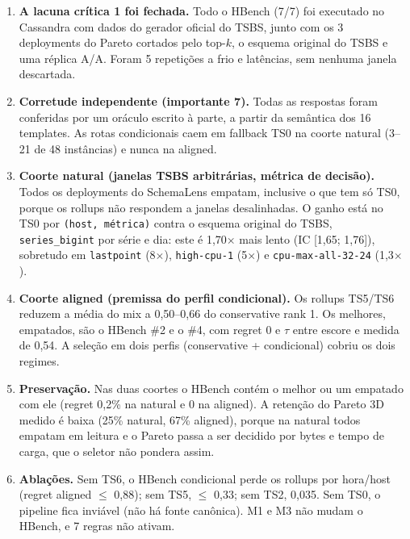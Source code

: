 \begin{enumerate}
\item \textbf{A lacuna crítica 1 foi fechada.} Todo o HBench (7/7) foi executado no Cassandra com dados do gerador oficial do TSBS, junto com os 3 deployments do Pareto cortados pelo top-$k$, o esquema original do TSBS e uma réplica A/A. Foram 5 repetições a frio e \envrawrows{} latências, sem nenhuma janela descartada.
\item \textbf{Corretude independente (importante 7).} Todas as respostas foram conferidas por um oráculo escrito à parte, a partir da semântica dos 16 templates. As rotas condicionais caem em fallback TS0 na coorte natural (3--21 de 48 instâncias) e nunca na aligned.
\item \textbf{Coorte natural (janelas TSBS arbitrárias, métrica de decisão).} Todos os deployments do SchemaLens empatam, inclusive o que tem só TS0, porque os rollups não respondem a janelas desalinhadas. O ganho está no TS0 por \texttt{(host, métrica)} contra o esquema original do TSBS, \texttt{series\_bigint} por série e dia: este é 1,70$\times$ mais lento (IC [1,65; 1,76]), sobretudo em \texttt{lastpoint} (8$\times$), \texttt{high-cpu-1} (5$\times$) e \texttt{cpu-max-all-32-24} (1,3$\times$).
\item \textbf{Coorte aligned (premissa do perfil condicional).} Os rollups TS5/TS6 reduzem a média do mix a 0,50--0,66 do conservative rank 1. Os melhores, empatados, são o HBench \#2 e o \#4, com regret 0 e $\tau$ entre escore e medida de 0,54. A seleção em dois perfis (conservative + condicional) cobriu os dois regimes.
\item \textbf{Preservação.} Nas duas coortes o HBench contém o melhor ou um empatado com ele (regret 0,2\% na natural e 0 na aligned). A retenção do Pareto 3D medido é baixa (25\% natural, 67\% aligned), porque na natural todos empatam em leitura e o Pareto passa a ser decidido por bytes e tempo de carga, que o seletor não pondera assim.
\item \textbf{Ablações.} Sem TS6, o HBench condicional perde os rollups por hora/host (regret aligned $\le$ 0,88); sem TS5, $\le$ 0,33; sem TS2, 0,035. Sem TS0, o pipeline fica inviável (não há fonte canônica). M1 e M3 não mudam o HBench, e 7 regras não ativam.
\end{enumerate}
